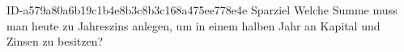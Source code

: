 \begin{exercise}
      {ID-a579a80a6b19c1b4e8b3c8b3c168a475ee778e4e}
      {Sparziel}
  \ifproblem\problem
    Welche Summe muss man heute zu  Jahreszins anlegen, um in einem
    halben Jahr an Kapital und Zinsen  zu besitzen?
  \fi
\end{exercise}
